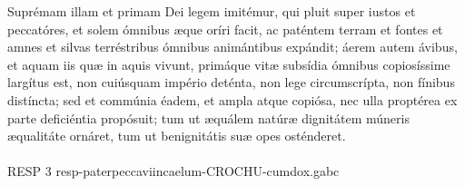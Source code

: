 \documentclass[options]{article}
\begin{document}
	\noindent Suprémam illam et primam Dei legem imitémur, qui pluit super iustos et peccatóres, et solem ómnibus æque oríri facit, ac paténtem terram et fontes et amnes et silvas terréstribus ómnibus animántibus expándit; áerem autem ávibus, et aquam iis quæ in aquis vivunt, primáque vitæ subsídia ómnibus copiosíssime largítus est, non cuiúsquam império deténta, non lege circumscrípta, non fínibus distíncta; sed et commúnia éadem, et ampla atque copiósa, nec ulla proptérea ex parte deficiéntia propósuit; tum ut æquálem natúræ dignitátem múneris æqualitáte ornáret, tum ut benignitátis suæ opes osténderet.\\
	\\
	RESP 3  resp-paterpeccaviincaelum-CROCHU-cumdox.gabc
\end{document}
